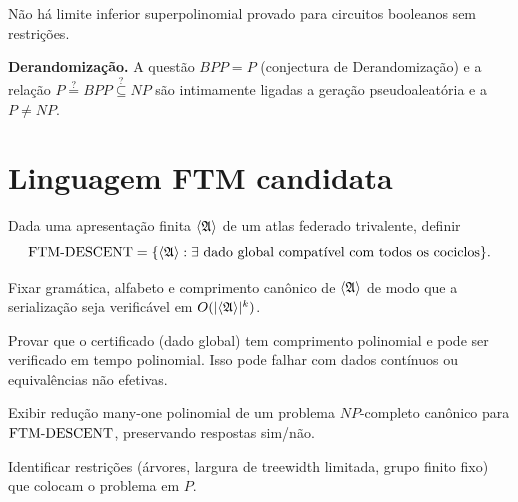 \documentclass[11pt,a4paper]{article}
\begin{document}
\begin{programs}
\begin{gap}
Não há limite inferior superpolinomial provado para circuitos
booleanos sem restrições. \OPEN
\end{gap}

\item \textbf{Derandomização.}
A questão $BPP=P$ (conjectura de Derandomização) e a relação
$P\stackrel{?}{=}BPP\stackrel{?}{\subseteq}NP$ são intimamente
ligadas a geração pseudoaleatória e a $P\neq NP$.

\end{programs}

\section{Linguagem FTM candidata}

\begin{definition}[$\FTMDESCENT$]
Dada uma apresentação finita $\langle\mathfrak{A}\rangle$ de um atlas
federado trivalente, definir
\[
  \mathrm{FTM\text{-}DESCENT}
  =\{\langle\mathfrak{A}\rangle : \exists\text{ dado global compatível
     com todos os cociclos}\}.
\]
\end{definition}

\begin{obligation}[C1 — Codificação]\label{ob:C1}
Fixar gramática, alfabeto e comprimento canônico de $\langle\mathfrak{A}\rangle$
de modo que a serialização seja verificável em $O(|\langle\mathfrak{A}\rangle|^k)$.
\end{obligation}

\begin{obligation}[C2 — Pertencimento a $NP$]\label{ob:C2}
Provar que o certificado (dado global) tem comprimento polinomial
e pode ser verificado em tempo polinomial.
Isso pode falhar com dados contínuos ou equivalências não efetivas.
\end{obligation}

\begin{obligation}[C3 — $NP$-dureza]\label{ob:C3}
Exibir redução many-one polinomial de um problema $NP$-completo
canônico para $\FTMDESCENT$, preservando respostas sim/não.
\end{obligation}

\begin{obligation}\label{ob:C4}
Identificar restrições (árvores, largura de treewidth limitada,
grupo finito fixo) que colocam o problema em $P$.
\end{obligation}
\end{document}
